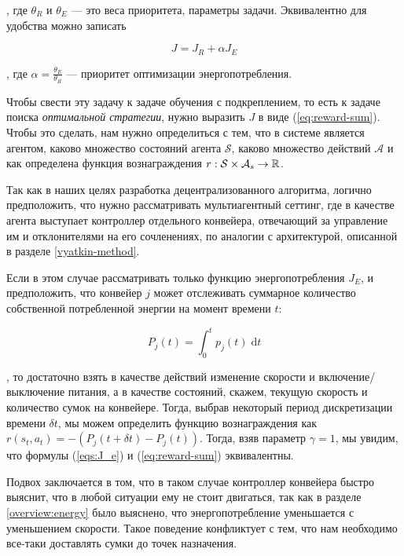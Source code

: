 \documentclass[specification,annotation,times]{itmo-student-thesis}
\theoremstyle{definition}
\begin{document}
, где $\theta_R$ и $\theta_E$ --- это веса приоритета, параметры задачи.
Эквивалентно для удобства можно записать

\begin{equation}
  J = J_R + \alpha J_E
\end{equation}

, где $\alpha = \frac{\theta_E}{\theta_R}$ --- приоритет оптимизации
энергопотребления.

Чтобы свести эту задачу к задаче обучения с подкреплением, то есть к задаче
поиска \textit{оптимальной стратегии}, нужно выразить $J$ в виде
(\ref{eq:reward-sum}). Чтобы это сделать, нам нужно определиться с тем, что в
системе является агентом, каково множество состояний агента $\mathcal{S}$,
каково множество действий $\mathcal{A}$ и как определена функция вознаграждения
$r : \mathcal{S} \times \mathcal{A}_s \rightarrow \Bbb{R}$.

Так как в наших целях разработка децентрализованного алгоритма, логично
предположить, что нужно рассматривать мультиагентный сеттинг, где в качестве
агента выступает контроллер отдельного конвейера, отвечающий за управление им и
отклонителями на его сочленениях, по аналогии с архитектурой, описанной в
разделе \ref{vyatkin-method}.

Если в этом случае рассматривать только функцию
энергопотребления $J_E$, и предположить, что конвейер $j$ может отслеживать
суммарное количество собственной потребленной энергии на момент времени $t$:

\begin{equation}
  P_j(t) = \int_0^t \! p_j(t) \; \mathrm{d}t
\end{equation}

, то достаточно взять в качестве действий изменение скорости и
включение/выключение питания, а в качестве состояний, скажем, текущую скорость и
количество сумок на конвейере. Тогда, выбрав некоторый период дискретизации
времени $\delta t$, мы можем определить функцию вознаграждения как
$r(s_t, a_t) = - (P_j(t + \delta t) - P_j(t))$. Тогда, взяв параметр
$\gamma = 1$, мы увидим, что формулы (\ref{eqs:J_e}) и (\ref{eq:reward-sum})
эквивалентны.

Подвох заключается в том, что в таком случае контроллер конвейера быстро
выяснит, что в любой ситуации ему не стоит двигаться, так как в разделе
\ref{overview:energy} было выяснено, что энергопотребление уменьшается с
уменьшением скорости. Такое поведение конфликтует с тем, что нам необходимо
все-таки доставлять сумки до точек назначения.
\end{document}
